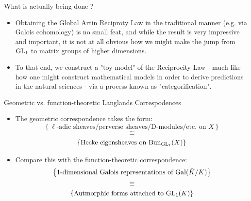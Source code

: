 \documentclass{beamer}
\begin{document}
    \begin{frame}{What is actually being done ?}
        \begin{itemize}
            \item Obtaining the Global Artin Reciproty Law in the traditional manner (e.g. via Galois cohomology) is no small feat, and while the result is very impressive and important, it is not at all obvious how we might make the jump from $\operatorname{GL}_1$ to matrix groups of higher dimensions.
            \item To that end, we construct a "toy model" of the Reciprocity Law - much like how one might construct mathematical models in order to derive predictions in the natural sciences - via a process known as "categorification".
        \end{itemize}
    \end{frame}
    
    \begin{frame}{Geometric vs. function-theoretic Langlands Correspodences}
        \begin{itemize}
            \item The geometric correspondence takes the form:
                $$\left\{\text{$\ell$-adic sheaves/perverse sheaves/D-modules/etc. on $X$}\right\}$$
                $$\cong$$
                $$\left\{\text{Hecke eigensheaves on $\mathrm{Bun}_{\operatorname{GL}_1}(X)$}\right\}$$
            \item Compare this with the function-theoretic correspondence:
                $$\left\{\text{$1$-dimensional Galois representations of $\mathrm{Gal}(\bar{K}/K)$}\right\}$$
                $$\cong$$
                $$\left\{\text{Autmorphic forms attached to $\operatorname{GL}_1(K)$}\right\}$$
        \end{itemize}
    \end{frame}
\end{document}
